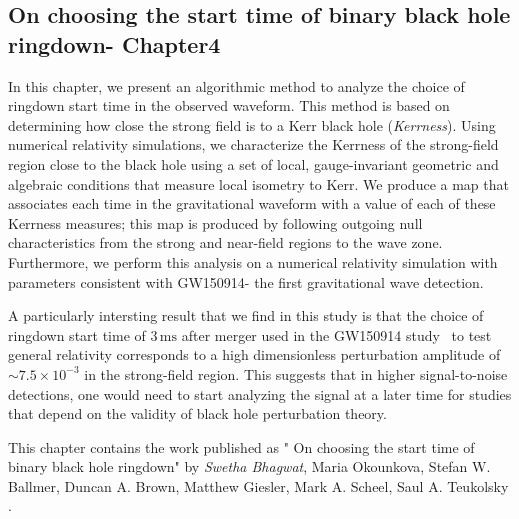 \subsection{On choosing the start time of binary black hole ringdown- Chapter4}
In this chapter, we
present an algorithmic method to analyze the choice of ringdown start time in
the observed waveform. This method is based on determining how close the strong
field is to a Kerr black hole (\textit{Kerrness}). Using numerical relativity
simulations, we characterize the Kerrness of the strong-field region close to
the black hole using a set of local, gauge-invariant geometric and algebraic
conditions that measure local isometry to Kerr. We produce a map that
associates each time in the gravitational waveform with a value of each of
these Kerrness measures; this map is produced by following outgoing null
characteristics from the strong and near-field regions to the wave zone. Furthermore, we
perform this analysis on a numerical relativity simulation with parameters
consistent with GW150914- the first gravitational wave detection. 

A particularly intersting result that  we find in this study is that the choice of ringdown start time of $3\,\mathrm{ms}$ after merger used in the
GW150914 study~\cite{TheLIGOScientific:2016src} to test general relativity corresponds to a high dimensionless
perturbation amplitude of $ \sim 7.5 \times 10^{-3}$ in the strong-field
region. This suggests that in higher signal-to-noise detections, one would need
to start analyzing the signal at a later time for studies that depend on the
validity of black hole perturbation theory.

This chapter contains the work published as "
On choosing the start time of binary black hole ringdown" by 
\textit{Swetha Bhagwat}, Maria Okounkova, Stefan W. Ballmer, Duncan A. Brown, Matthew Giesler, Mark A. Scheel, Saul A. Teukolsky \cite{MeAndMasha}.

